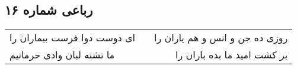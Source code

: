 \begin{center}
\section*{رباعی شماره ۱۶}
\label{sec:sh016}
\begin{longtable}{l p{0.5cm} r}
ای دوست دوا فرست بیماران را
&&
روزی ده جن و انس و هم یاران را
\\
ما تشنه لبان وادی حرمانیم
&&
بر کشت امید ما بده باران را
\\
\end{longtable}
\end{center}
